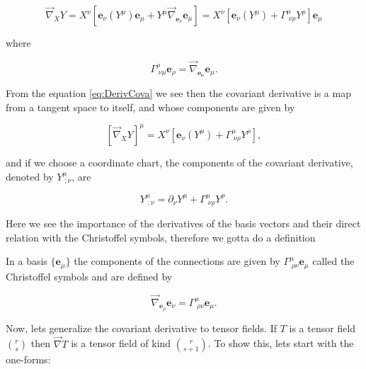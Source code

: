         \begin{equation}\label{eq:DerivCova}
            \Vec{\nabla}_XY = X^{\nu}\left[\mathbf{e}_{\nu}(Y^{\mu})\mathbf{e}_{\mu} + Y^{\mu}\Vec{\nabla}_{\mathbf{e}_{\nu}}\mathbf{e}_{\mu}\right] = X^{\nu}\left[\mathbf{e}_{\nu}(Y^{\mu}) + \Gamma^{\mu}_{\;\nu\rho}Y^{\rho} \right]\mathbf{e}_{\mu}
        \end{equation}

        where

        \begin{equation}
            \Gamma^{\rho}_{\;\nu\mu}\mathbf{e}_{\rho} = \Vec{\nabla}_{\mathbf{e_{\nu}}}\mathbf{e}_{\mu}.
        \end{equation}

        From the equation \ref{eq:DerivCova} we see then the covariant derivative is a map from a tangent space to itself, and whose components are given by

        \begin{equation}
            \left[\Vec{\nabla}_XY \right]^{\mu} = X^{\nu}\left[\mathbf{e}_{\nu}(Y^{\mu}) + \Gamma^{\mu}_{\;\nu\rho}Y^{\rho} \right],
        \end{equation}

        and if we choose a coordinate chart, the components of the covariant derivative, denoted by $Y^{\mu}_{\;;\nu}$, are

        \begin{equation}
            Y^{\mu}_{\;;\nu} = \partial_{\nu}Y^{\mu}+\Gamma^{\mu}_{\;\nu\rho}Y^{\rho}.
        \end{equation}

        Here we see the importance of the derivatives of the basis vectors and their direct relation with the Christoffel symbols, therefore we gotta do a definition

        \begin{myDef}
            In a basis $\{\mathbf{e}_{\mu}\}$ the components of the connections are given by $\Gamma^{\mu}_{\;\rho\nu}\mathbf{e}_{\mu}$ called the Christoffel symbols and are defined by

            \begin{equation}
                \Vec{\nabla}_{\mathbf{e}_{\rho}}\mathbf{e}_{\nu} = \Gamma^{\mu}_{\;\rho\nu}\mathbf{e}_{\mu}.
            \end{equation}
        \end{myDef}

        Now, lets generalize the covariant derivative to tensor fields. If $T$ is a tensor field $\binom{r}{s}$ then $\Vec{\nabla}T$ is a tensor field of kind $\binom{r}{s+1}$. To show this, lets start with the one-forms:

